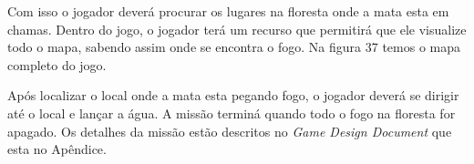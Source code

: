 Com isso o jogador deverá procurar os lugares na floresta onde a mata esta em chamas. Dentro do jogo, o jogador terá um recurso que permitirá que ele visualize todo o mapa, sabendo assim onde se encontra o fogo. Na figura 37 temos o mapa completo do jogo.

\pagebreak
\begin{figure}[h!]
		\centering
	\end{figure}

Após localizar o local onde a mata esta pegando fogo, o jogador deverá se dirigir até o local e  lançar a água. A missão terminá quando todo o fogo na floresta for apagado. Os detalhes da missão estão descritos no \textit{Game Design Document} que esta no Apêndice.
